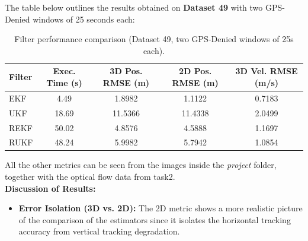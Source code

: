 \documentclass{article}
\begin{document}
The table below outlines the results obtained on \textbf{Dataset 49} with two GPS-Denied windows of 25 seconds each:

\begin{table}[h]
\centering
\begin{tabular}{|l|c|c|c|c|}
\hline
\textbf{Filter} & \textbf{Exec. Time (s)} & \textbf{3D Pos. RMSE (m)} & \textbf{2D Pos. RMSE (m)} & \textbf{3D Vel. RMSE (m/s)} \\ \hline
EKF  & 4.49  & 1.8982  & 1.1122  & 0.7183  \\ \hline
UKF  & 18.69  & 11.5366  & 11.4338  & 2.0499  \\ \hline
REKF & 50.02 & 4.8576  & 4.5888  & 1.1697  \\ \hline
RUKF & 48.24 & 5.9982  & 5.7942  & 1.0854  \\ \hline
\end{tabular}
\caption{Filter performance comparison (Dataset 49, two GPS-Denied windows of 25s each).}
\label{tab:results_2d}
\end{table}

All the other metrics can be seen from the images inside the \textit{project} folder, together with the optical flow data from task2.\\

\textbf{Discussion of Results:}
\begin{itemize}
    \item \textbf{Error Isolation (3D vs. 2D):} The 2D metric shows a more realistic picture of the comparison of the estimators since it isolates the horizontal tracking accuracy from vertical tracking degradation.
\end{itemize}
\end{document}
